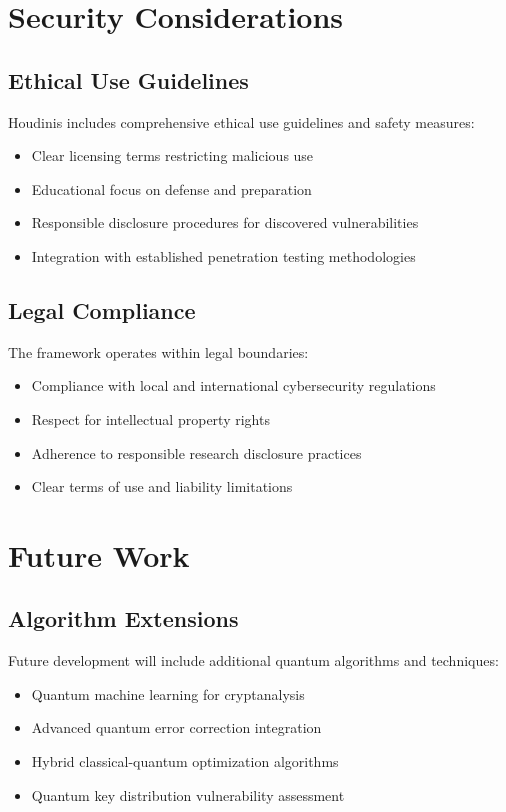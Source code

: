\documentclass[11pt]{article}
\begin{document}
\section{Security Considerations}

\subsection{Ethical Use Guidelines}

Houdinis includes comprehensive ethical use guidelines and safety measures:

\begin{itemize}
\item Clear licensing terms restricting malicious use
\item Educational focus on defense and preparation
\item Responsible disclosure procedures for discovered vulnerabilities
\item Integration with established penetration testing methodologies
\end{itemize}

\subsection{Legal Compliance}

The framework operates within legal boundaries:

\begin{itemize}
\item Compliance with local and international cybersecurity regulations
\item Respect for intellectual property rights
\item Adherence to responsible research disclosure practices
\item Clear terms of use and liability limitations
\end{itemize}

\section{Future Work}

\subsection{Algorithm Extensions}

Future development will include additional quantum algorithms and techniques:

\begin{itemize}
\item Quantum machine learning for cryptanalysis
\item Advanced quantum error correction integration
\item Hybrid classical-quantum optimization algorithms
\item Quantum key distribution vulnerability assessment
\end{itemize}
\end{document}
